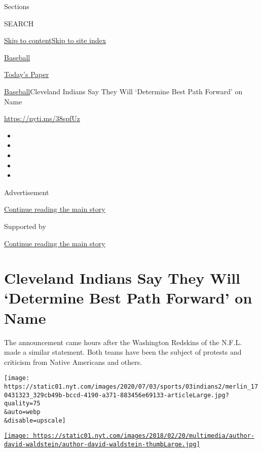 Sections

SEARCH

\protect\hyperlink{site-content}{Skip to
content}\protect\hyperlink{site-index}{Skip to site index}

\href{https://www.nytimes.com/section/sports/baseball}{Baseball}

\href{https://myaccount.nytimes.com/auth/login?response_type=cookie\&client_id=vi}{}

\href{https://www.nytimes.com/section/todayspaper}{Today's Paper}

\href{/section/sports/baseball}{Baseball}\textbar{}Cleveland Indians Say
They Will `Determine Best Path Forward' on Name

\url{https://nyti.ms/38spfUz}

\begin{itemize}
\item
\item
\item
\item
\item
\end{itemize}

Advertisement

\protect\hyperlink{after-top}{Continue reading the main story}

Supported by

\protect\hyperlink{after-sponsor}{Continue reading the main story}

\hypertarget{cleveland-indians-say-they-will-determine-best-path-forward-on-name}{%
\section{Cleveland Indians Say They Will `Determine Best Path Forward'
on
Name}\label{cleveland-indians-say-they-will-determine-best-path-forward-on-name}}

The announcement came hours after the Washington Redskins of the N.F.L.
made a similar statement. Both teams have been the subject of protests
and criticism from Native Americans and others.

\texttt{[image: https://static01.nyt.com/images/2020/07/03/sports/03indians2/merlin\_170431323\_329cb49b-bccd-4190-a371-883456e69133-articleLarge.jpg?quality=75\\\&auto=webp\\\&disable=upscale]}

\href{https://www.nytimes.com/by/david-waldstein}{\texttt{[image: https://static01.nyt.com/images/2018/02/20/multimedia/author-david-waldstein/author-david-waldstein-thumbLarge.jpg]}}

